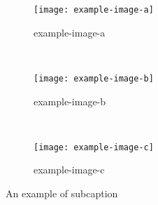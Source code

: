 \documentclass{article}
\begin{document}
\begin{figure}
\centering
\begin{subfigure}[b]{0.3\textwidth}
    \texttt{[image: example-image-a]}
    \caption{example-image-a}
    \label{subfig:a}
\end{subfigure}
~ %
\begin{subfigure}[b]{0.3\textwidth}
    \texttt{[image: example-image-b]}
    \caption{example-image-b}
    \label{subfig:b}
\end{subfigure}
~ %
\begin{subfigure}[b]{0.3\textwidth}
    \texttt{[image: example-image-c]}
    \caption{example-image-c}
    \label{subfig:c}
\end{subfigure}
\caption{An example of subcaption}\label{subcaption}
\end{figure}
\end{document}
